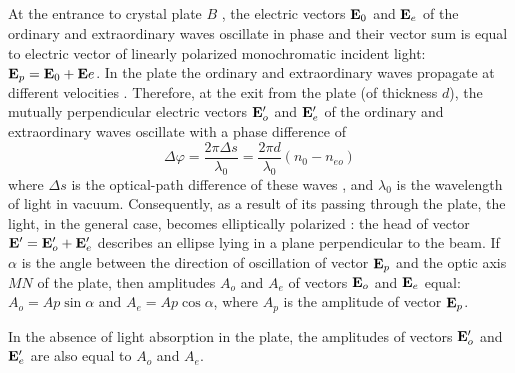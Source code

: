 \subsection{}\label{35.3.3} At the entrance to crystal plate $B$ , the electric vectors $\vb{E}_{0}$ and $\vb{E}_{e}$ of the ordinary and extraordinary waves oscillate
in phase and their vector sum is equal to electric vector
of linearly polarized monochromatic incident light: $\vb{E}_{p} = \vb{E}_{0} + \vb{E}e$. In the plate the ordinary and extraordinary waves propagate at different velocities . Therefore, at the exit from the plate (of thickness $d$), the mutually perpendicular electric
vectors $\vb{E}_{o}'$ and $\vb{E}_{e}'$ of the ordinary and extraordinary waves oscillate with a phase difference of
\begin{equation*}%
\Delta \varphi = \frac{2 \pi \Delta s}{\lambda_{0}} =\frac{2 \pi d}{\lambda_{0}} (n_{0} - n_{eo})
\end{equation*}
where $ \Delta s$ is the optical-path difference of these waves , and $\lambda_{0}$ is the wavelength of light in vacuum. Consequently, as a result of its passing through the plate, the light, in the general case, becomes elliptically polarized : the head of vector
$\vb{E}' = \vb{E}'_{o} + \vb{E}_{e}'$ describes an ellipse lying in a plane perpendicular to the beam. If $\alpha$ is the angle between the direction of oscillation of vector $\vb{E}_{p}$ and the optic axis $MN$ of the plate, then amplitudes ${A}_{o}$ and ${A}_{e}$ of vectors $\vb{E}_{o}$ and $\vb{E}_{e}$ equal: $A_{o} = Ap \sin \alpha$ and $A_{e} = Ap \cos \alpha$, where $A_{p}$ is the amplitude of vector $\vb{E}_{p}$.

In the absence of light absorption in the plate, the amplitudes of vectors $\vb{E}'_{o}$ and $\vb{E}'_{e}$ are also equal to $A_{o}$ and $A_{e}$.

